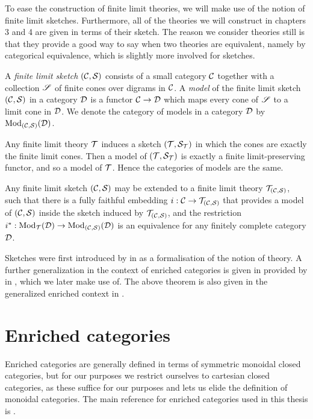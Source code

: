 \documentclass[../thesis.tex]{subfiles}
\begin{document}
To ease the construction of finite limit theories, we will make use of the notion of finite limit sketches. Furthermore,
all of the theories we will construct in chapters 3 and 4 are given in terms of their sketch. The reason we consider
theories still is that they provide a good way to say when two theories are equivalent, namely by categorical equivalence,
which is slightly more involved for sketches.
\begin{definition}
  A \emph{finite limit sketch} $({\mathcal{C}},{\mathcal{S}})$ consists of a small category ${\mathcal{C}}$ together with a collection ${\mathscr{S}}$ of finite
  cones over digrams in ${\mathcal{C}}$. A \emph{model} of the finite limit sketch $({\mathcal{C}},{\mathcal{S}})$ in a category ${\mathcal{D}}$ is a functor
  ${\mathcal{C}} \to {\mathcal{D}}$ which maps every cone of ${\mathscr{S}}$ to a limit cone in ${\mathcal{D}}$. We denote the category of models in a category
  ${\mathcal{D}}$ by ${\mathrm{Mod}}_{({\mathcal{C}},{\mathcal{S}})}({\mathcal{D}})$.
\end{definition}

\begin{remark}
  Any finite limit theory ${\mathcal{T}}$ induces a sketch $({\mathcal{T}},{\mathcal{S}}_{\mathcal{T}})$ in which the cones are exactly the finite limit cones.
  Then a model of $({\mathcal{T}},{\mathcal{S}}_{\mathcal{T}})$ is exactly a finite limit-preserving functor, and so a model of ${\mathcal{T}}$. Hence the categories
  of models are the same.
\end{remark}

\begin{theorem}
  Any finite limit sketch $({\mathcal{C}},{\mathcal{S}})$ may be extended to a finite limit theory ${\mathcal{T}}_{({\mathcal{C}},{\mathcal{S}})}$, such that
  there is a fully faithful embedding $i : {\mathcal{C}} \to {\mathcal{T}}_{({\mathcal{C}},{\mathcal{S}})}$ that provides a model of $({\mathcal{C}},{\mathcal{S}})$ inside
  the sketch induced by ${\mathcal{T}}_{({\mathcal{C}},{\mathcal{S}})}$, and the restriction $i^* : {\mathrm{Mod}}_{\mathcal{T}}({\mathcal{D}}) \to {\mathrm{Mod}}_{({\mathcal{C}},{\mathcal{S}})}({\mathcal{D}})$ is an
  equivalence for any finitely complete category ${\mathcal{D}}$.
\end{theorem}

\begin{literature}
  Sketches were first introduced by \citeauthor{ehresmann1969} in \cite{ehresmann1969} as a formalisation of the notion of
  theory. A further generalization in the context of enriched categories is given in provided by \citeauthor{kelly1982a} in
  \cite{kelly1982a}, which we later make use of. The above theorem is also given in the generalized enriched context in
  \cite{kelly1982a}.
\end{literature}

\section{Enriched categories}
\label{sec:enriched}
Enriched categories are generally defined in terms of symmetric monoidal closed categories, but for our purposes
we restrict ourselves to cartesian closed categories, as these suffice for our purposes and lets us elide the
definition of monoidal categories. The main reference for enriched categories used in this thesis is \cite{kelly1982a}.
\end{document}
